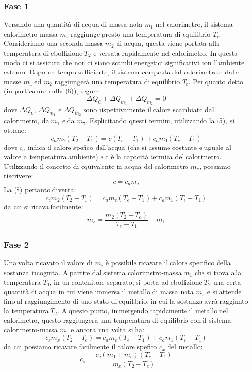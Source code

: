 \subsubsection{Fase 1}
Versando una quantità di acqua di massa nota $m_1$ nel calorimetro, il sistema calorimetro-massa $m_1$ raggiunge presto una temperatura di equilibrio $T_e$. Consideriamo una seconda massa $m_2$ di acqua, questa viene portata alla temperatura di ebollizione $T_2$ e versata rapidamente nel calorimetro. In questo modo ci si assicura che non ci siano scambi energetici significativi con l'ambiente esterno. Dopo un tempo sufficiente, il sistema composto dal calorimetro e dalle masse $m_1$ ed $m_2$ raggiungerà una temperatura di equilibrio $T_e$. Per quanto detto (in particolare dalla (6)), segue:
\begin{equation}
    \Delta Q_C + \Delta Q_{m_1} + \Delta Q_{m_2} = 0
\end{equation}
dove $\Delta Q_C$, $\Delta Q_{m_1}$ e $\Delta Q_{m_2}$ sono rispettivamente il calore scambiato dal calorimetro, da $m_1$ e da $m_2$. Esplicitando questi termini, utilizzando la (5), si ottiene:
\begin{equation}
    c_am_2(T_2 - T_1) = c(T_e - T_1) + c_am_1(T_e - T_1)
\end{equation}
dove $c_a$ indica il calore spefico dell'acqua (che si assume costante e uguale al valore a temperatura ambiente) e c è la capacità termica del calorimetro. Utilizzando il concetto di equivalente in acqua del calorimetro $m_e$, possiamo riscrivere:
\begin{equation}
    c = c_am_a
\end{equation}
La (8) pertanto diventa:
\begin{equation}
    c_am_2(T_2 - T_1) = c_am_e(T_e - T_1) + c_am_1(T_e - T_1)
\end{equation}
da cui si ricava facilmente:
\begin{equation}
    m_e = \frac{m_2(T_2 - T_e)}{T_e - T_1}-m_1
\end{equation}

\subsubsection{Fase 2}
Una volta ricavato il valore di $m_e$ è possibile ricavare il calore specifico della sostanza incognita. A partire dal sistema calorimetro-massa $m_1$ che si trova alla temperatura $T_1$, in un contenitore separato, si porta ad ebollizione $T_2$ una certa quantità di acqua in cui viene immersa il metallo di massa nota $m_x$ e si attende fino al raggiungimento di uno stato di equilibrio, in cui la sostanza avrà raggiunto la temperatura $T_2$. A questo punto, immergendo rapidamente il metallo nel calorimetro, questo raggiungerà una temperatura di equilibrio con il sistema calorimetro-massa $m_1$ e ancora una volta si ha:
\begin{equation}
    c_xm_x(T_2 - T_e) = c_am_e(T_e - T_1) + c_am_1(T_e - T_1)
\end{equation}
da cui possiamo ricavare facilmente il calore spefico $c_x$ del metallo:
\begin{equation}
    c_x = \frac{c_a(m_1 + m_e)(T_e - T_1)}{m_x(T_2 - T_e)}
\end{equation}